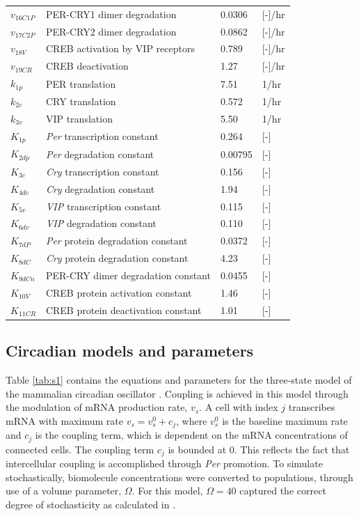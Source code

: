 \begin{table}[p]
\begin{center}
\begin{tabular}{l l l l}
	\\
	$v_{16C1P}$ & PER-CRY1 dimer degradation & 0.0306 & [-]/hr
	\\
	$v_{17C2P}$ & PER-CRY2 dimer degradation & 0.0862 & [-]/hr
	\\
	$v_{18V}$ & CREB activation by VIP receptors & 0.789 & [-]/hr
	\\
	$v_{19CR}$ & CREB deactivation & 1.27& [-]/hr
	\\
	$k_{1p}$ & PER translation & 7.51 & 1/hr	
	\\
	$k_{2c}$ & CRY translation & 0.572 & 1/hr
	\\
	$k_{3v}$ & VIP translation & 5.50 & 1/hr
	\\
	$K_{1p}$ & \textit{Per} transcription constant & 0.264 & [-]
	\\
	$K_{2dp}$ & \textit{Per} degradation constant & 0.00795 & [-]
	\\
	$K_{3c}$ & \textit{Cry} transcription constant & 0.156 & [-]
	\\
	$K_{4dc}$ & \textit{Cry} degradation constant & 1.94 & [-]
	\\
	$K_{5v}$ & \textit{VIP} transcription constant & 0.115 & [-]
	\\
	$K_{6dv}$ & \textit{VIP} degradation constant & 0.110 & [-]
	\\
	$K_{7dP}$ & \textit{Per} protein degradation constant & 0.0372 & [-]
	\\
	$K_{8dC}$ & \textit{Cry} protein degradation constant & 4.23 & [-]
	\\
	$K_{9dCn}$ & PER-CRY dimer degradation constant & 0.0455 & [-]
	\\
	$K_{10V}$ & CREB protein activation constant & 1.46 & [-]
	\\
    $K_{11CR}$ & CREB protein deactivation constant & 1.01 & [-]
    \\[0.0cm]
	\hline
\end{tabular}
\end{center}
\end{table}


\subsection*{Circadian models and parameters}
\label{sub:models}
Table \ref{tab:s1} contains the equations and parameters for the three-state model of the mammalian circadian oscillator \cite{Gonze2006, Schroder2012}.
Coupling is achieved in this model through the modulation of mRNA production rate, $v_s$.
A cell with index $j$ transcribes mRNA with maximum rate $v_s = v_s^0 +c_j$, where $v_s^0$ is the baseline maximum rate and $c_j$ is the coupling term, which is dependent on the mRNA concentrations of connected cells.
The coupling term $c_j$ is bounded at 0. 
This reflects the fact that intercellular coupling is accomplished through \textit{Per} promotion.
To simulate stochastically, biomolecule concentrations were converted to populations, through use of a volume parameter, $\Omega$. For this model, $\Omega = 40$ captured the correct degree of stochasticity as calculated in \cite{Rougemont2007, StJohn2014b}.

